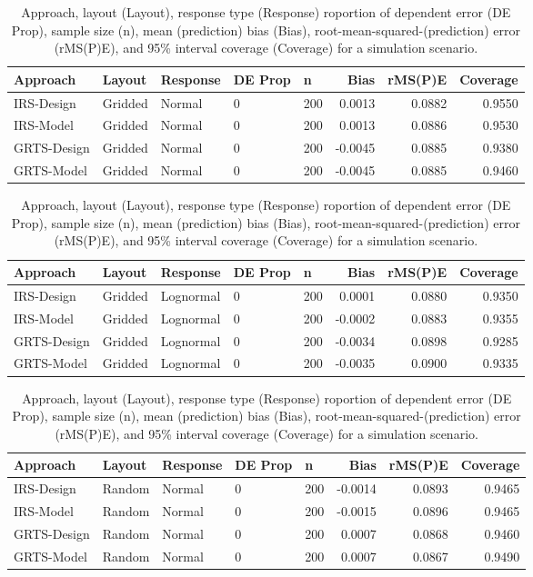 \documentclass[]{elsarticle} %
\begin{document}
\begin{table}[ht]
\centering
\begin{tabular}{lllllrrr}
  \hline
Approach & Layout & Response & DE Prop & n & Bias & rMS(P)E & Coverage \\ 
  \hline
IRS-Design & Gridded & Normal & 0 & 200 & 0.0013 & 0.0882 & 0.9550 \\ 
  IRS-Model & Gridded & Normal & 0 & 200 & 0.0013 & 0.0886 & 0.9530 \\ 
  GRTS-Design & Gridded & Normal & 0 & 200 & -0.0045 & 0.0885 & 0.9380 \\ 
  GRTS-Model & Gridded & Normal & 0 & 200 & -0.0045 & 0.0885 & 0.9460 \\ 
   \hline
\end{tabular}
\caption{Approach, layout (Layout), response type (Response) roportion of dependent error (DE Prop), sample size (n), mean (prediction) bias (Bias), root-mean-squared-(prediction) error (rMS(P)E), and 95\% interval coverage (Coverage) for a simulation scenario.} 
\end{table}
\begin{table}[ht]
\centering
\begin{tabular}{lllllrrr}
  \hline
Approach & Layout & Response & DE Prop & n & Bias & rMS(P)E & Coverage \\ 
  \hline
IRS-Design & Gridded & Lognormal & 0 & 200 & 0.0001 & 0.0880 & 0.9350 \\ 
  IRS-Model & Gridded & Lognormal & 0 & 200 & -0.0002 & 0.0883 & 0.9355 \\ 
  GRTS-Design & Gridded & Lognormal & 0 & 200 & -0.0034 & 0.0898 & 0.9285 \\ 
  GRTS-Model & Gridded & Lognormal & 0 & 200 & -0.0035 & 0.0900 & 0.9335 \\ 
   \hline
\end{tabular}
\caption{Approach, layout (Layout), response type (Response) roportion of dependent error (DE Prop), sample size (n), mean (prediction) bias (Bias), root-mean-squared-(prediction) error (rMS(P)E), and 95\% interval coverage (Coverage) for a simulation scenario.} 
\end{table}
\begin{table}[ht]
\centering
\begin{tabular}{lllllrrr}
  \hline
Approach & Layout & Response & DE Prop & n & Bias & rMS(P)E & Coverage \\ 
  \hline
IRS-Design & Random & Normal & 0 & 200 & -0.0014 & 0.0893 & 0.9465 \\ 
  IRS-Model & Random & Normal & 0 & 200 & -0.0015 & 0.0896 & 0.9465 \\ 
  GRTS-Design & Random & Normal & 0 & 200 & 0.0007 & 0.0868 & 0.9460 \\ 
  GRTS-Model & Random & Normal & 0 & 200 & 0.0007 & 0.0867 & 0.9490 \\ 
   \hline
\end{tabular}
\caption{Approach, layout (Layout), response type (Response) roportion of dependent error (DE Prop), sample size (n), mean (prediction) bias (Bias), root-mean-squared-(prediction) error (rMS(P)E), and 95\% interval coverage (Coverage) for a simulation scenario.} 
\end{table}
\end{document}
